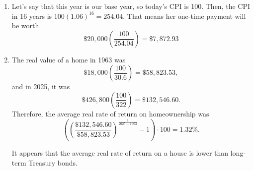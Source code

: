 \documentclass{article}
\begin{document}
\begin{enumerate}
\item Let's say that this year is our base year, so today's CPI is 100. Then, the CPI in 16 years is $100(1.06)^16 = 254.04$. That means her one-time payment will be worth
	\begin{equation*}
	\$20,000 \left( \frac{100}{254.04} \right) = \$7,872.93
	\end{equation*} 
	
\item The real value of a home in 1963 was
	\begin{equation*}
	\$18,000 \left( \frac{100}{30.6} \right) = \$58,823.53,
	\end{equation*}
	and in 2025, it was
	\begin{equation*}
	\$426,800 \left( \frac{100}{322} \right) = \$132,546.60.
	\end{equation*}
	Therefore, the average real rate of return on homeownership was
	\begin{equation*}
	\left( \left( \frac{\$132,546.60}{\$58,823.53} \right)^{\frac{1}{2025 - 1963}} - 1 \right) \cdot 100 = 1.32\%.
	\end{equation*}
	
	It appears that the average real rate of return on a house is lower than long-term Treasury bonds. 
	


\end{enumerate}
\end{document}
